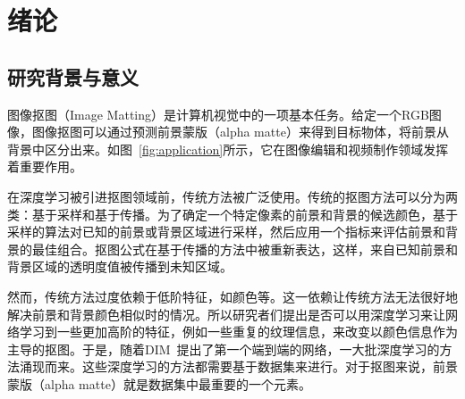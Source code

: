 \documentclass[supercite]{HustGraduPaper}
\begin{document}
	\tableofcontents
	
	\clearpage%
	
	\section{绪论}
	\subsection{研究背景与意义}
	图像抠图（Image Matting）是计算机视觉中的一项基本任务。给定一个RGB图像，图像抠图可以通过预测前景蒙版（alpha matte）来得到目标物体，将前景从背景中区分出来。如图~\ref{fig:application}所示，它在图像编辑和视频制作领域发挥着重要作用。

    在深度学习被引进抠图领域前，传统方法被广泛使用。传统的抠图方法可以分为两类：基于采样和基于传播。为了确定一个特定像素的前景和背景的候选颜色，基于采样的算法对已知的前景或背景区域进行采样，然后应用一个指标来评估前景和背景的最佳组合。抠图公式在基于传播的方法中被重新表达，这样，来自已知前景和背景区域的透明度值被传播到未知区域。

    然而，传统方法过度依赖于低阶特征，如颜色等。这一依赖让传统方法无法很好地解决前景和背景颜色相似时的情况。所以研究者们提出是否可以用深度学习来让网络学习到一些更加高阶的特征，例如一些重复的纹理信息，来改变以颜色信息作为主导的抠图。于是，随着DIM~\cite{DIM}提出了第一个端到端的网络，一大批深度学习的方法涌现而来。这些深度学习的方法都需要基于数据集来进行。对于抠图来说，前景蒙版（alpha matte）就是数据集中最重要的一个元素。
\end{document}
